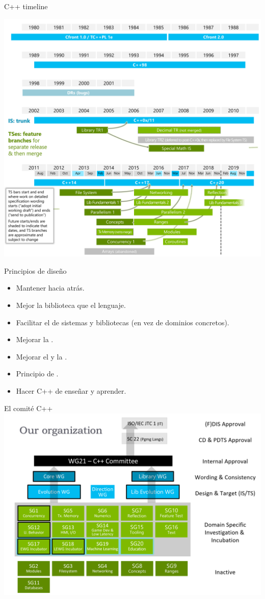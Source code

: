 \begin{frame}{C++ timeline}
\begin{center}
\includegraphics[height=.8\textheight]{img/wg21-timeline.png}
\end{center}
\end{frame}

\begin{frame}[t]{Principios de diseño}
\begin{itemize}
  \item \vfill\pause  Mantener  hacia atrás.
  \item \vfill\pause  Mejor  la biblioteca que el lenguaje.
  \item \vfill\pause  Facilitar el  de sistemas y bibliotecas (en vez de dominios concretos).
  \item \vfill\pause  Mejorar la .
  \item \vfill\pause  Mejorar el  y la .
  \item \vfill\pause  Principio de .
  \item \vfill\pause  Hacer C++  de enseñar y aprender.
\end{itemize}
\end{frame}

\begin{frame}{El comité C++}
\includegraphics[width=.8\textwidth]{img/wg21-structure.png}
\end{frame}

